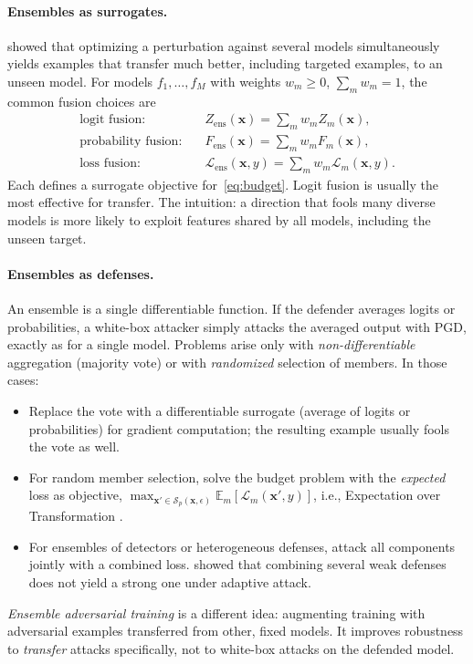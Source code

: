 \documentclass[10pt,a4paper]{extarticle}
\theoremstyle{definition}
\newcommand{\Loss}{\mathcal{L}}
\newcommand{\x}{\mathbf{x}}
\newcommand{\xadv}{\mathbf{x}'}
\begin{document}
\paragraph{Ensembles as surrogates.} \citet{liu2017delving} showed that optimizing a perturbation against several models simultaneously yields examples that transfer much better, including targeted examples, to an unseen model. For models \(f_1,\dots,f_M\) with weights \(w_m\ge0\), \(\sum_m w_m=1\), the common fusion choices are
\begin{align*}
\text{logit fusion:}\quad & Z_{\text{ens}}(\x) = \textstyle\sum_m w_m Z_m(\x), \\
\text{probability fusion:}\quad & F_{\text{ens}}(\x) = \textstyle\sum_m w_m F_m(\x), \\
\text{loss fusion:}\quad & \Loss_{\text{ens}}(\x,y) = \textstyle\sum_m w_m \Loss_m(\x,y).
\end{align*}
Each defines a surrogate objective for~\eqref{eq:budget}. Logit fusion is usually the most effective for transfer. The intuition: a direction that fools many diverse models is more likely to exploit features shared by all models, including the unseen target.

\paragraph{Ensembles as defenses.} An ensemble is a single differentiable function. If the defender averages logits or probabilities, a white-box attacker simply attacks the averaged output with PGD, exactly as for a single model. Problems arise only with \emph{non-differentiable} aggregation (majority vote) or with \emph{randomized} selection of members. In those cases:
\begin{itemize}
  \item Replace the vote with a differentiable surrogate (average of logits or probabilities) for gradient computation; the resulting example usually fools the vote as well.
  \item For random member selection, solve the budget problem with the \emph{expected} loss as objective, \(\max_{\xadv\in\mathcal{S}_p(\x,\epsilon)}\mathbb{E}_m[\Loss_m(\xadv,y)]\), i.e., Expectation over Transformation \citep{athalye2018eot}.
  \item For ensembles of detectors or heterogeneous defenses, attack all components jointly with a combined loss. \citet{he2017ensemble} showed that combining several weak defenses does not yield a strong one under adaptive attack.
\end{itemize}
\emph{Ensemble adversarial training} \citep{tramer2018ensemble} is a different idea: augmenting training with adversarial examples transferred from other, fixed models. It improves robustness to \emph{transfer} attacks specifically, not to white-box attacks on the defended model.
\end{document}
